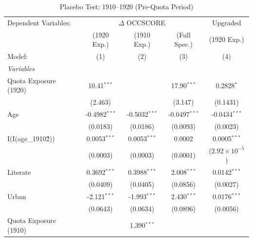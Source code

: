 
\begin{table}[htbp]
   \caption{\label{tab:placebo} Placebo Test: 1910--1920 (Pre-Quota Period)}
   \centering
   \begin{tabular}{lcccc}
      \tabularnewline \midrule \midrule
      Dependent Variables: & \multicolumn{3}{c}{$\Delta$ OCCSCORE} & Upgraded\\
                            & (1920 Exp.)  & (1910 Exp.)  & (Full Spec.)  & (1920 Exp.) \\
      Model:                & (1)                           & (2)                           & (3)                      & (4)\\  
      \midrule
      \emph{Variables}\\
      Quota Exposure (1920) & 10.41$^{***}$                 &                               & 17.90$^{***}$            & 0.2828$^{*}$\\   
                            & (2.463)                       &                               & (3.147)                  & (0.1431)\\   
      Age                   & -0.4982$^{***}$               & -0.5032$^{***}$               & -0.0497$^{***}$          & -0.0434$^{***}$\\   
                            & (0.0183)                      & (0.0186)                      & (0.0093)                 & (0.0023)\\   
      I(I(age\_1910\^2))    & 0.0053$^{***}$                & 0.0053$^{***}$                & 0.0002                   & 0.0005$^{***}$\\   
                            & (0.0003)                      & (0.0003)                      & (0.0001)                 & ($2.92\times 10^{-5}$)\\    
      Literate              & 0.3692$^{***}$                & 0.3988$^{***}$                & 2.008$^{***}$            & 0.0142$^{***}$\\   
                            & (0.0409)                      & (0.0405)                      & (0.0856)                 & (0.0027)\\   
      Urban                 & -2.121$^{***}$                & -1.993$^{***}$                & 2.430$^{***}$            & 0.0176$^{***}$\\   
                            & (0.0643)                      & (0.0634)                      & (0.0896)                 & (0.0056)\\   
      Quota Exposure (1910) &                               & 1.390$^{***}$                 &                          &   \\   

\end{tabular}
\end{table}
